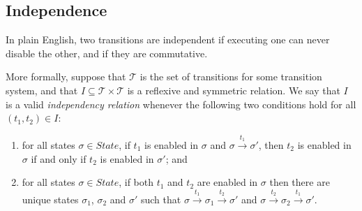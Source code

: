 \documentclass[12pt,a4paper,twoside,openright]{report}
\begin{document}
\subsection{Independence} \label{sec:independence}
In plain English, two transitions are independent if executing one
can never disable the other, and if they are commutative.

More formally, suppose that $\mathcal{T}$ is the set of
transitions for some transition system, and
that $I \subseteq \mathcal{T} \times \mathcal{T}$
is a reflexive and symmetric relation. We say
that $I$ is a valid \emph{independency relation}
whenever the following two conditions hold for
all $(t_1, t_2) \in I$:
\begin{enumerate}
	\item for all states $\sigma \in \textit{State}$,
		if $t_1$ is enabled in $\sigma$ and
		$\sigma \xrightarrow{t_1} \sigma'$, then
		$t_2$ is enabled in $\sigma$ if and only if
		$t_2$ is enabled in $\sigma'$; and
	\item for all states $\sigma \in \textit{State}$,
		if both $t_1$ and $t_2$ are enabled in $\sigma$
		then there are unique states $\sigma_1$, $\sigma_2$ and
		$\sigma'$ such that
		$\sigma \xrightarrow{t_1} \sigma_1 \xrightarrow{t_2} \sigma'$
		and
		$\sigma \xrightarrow{t_2} \sigma_2 \xrightarrow{t_1} \sigma'$.
\end{enumerate}
\end{document}
